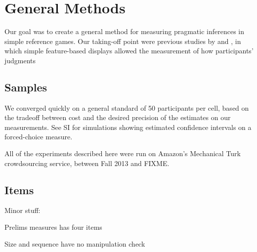 \section{General Methods}

Our goal was to create a general method for measuring pragmatic inferences in simple reference games. Our taking-off point were previous studies by  and , in which simple feature-based displays allowed the measurement of how participants' judgments 


\subsection{Samples}

We converged quickly on a general standard of 50 participants per cell, based on the tradeoff between cost and the desired precision of the estimates on our measurements. See SI for simulations showing estimated confidence intervals on a forced-choice measure. 

All of the experiments described here were run on Amazon's Mechanical Turk crowdsourcing service, between Fall 2013 and FIXME. 


\subsection{Items}




Minor stuff:

Prelims measures has four items

Size and sequence have no manipulation check 
 